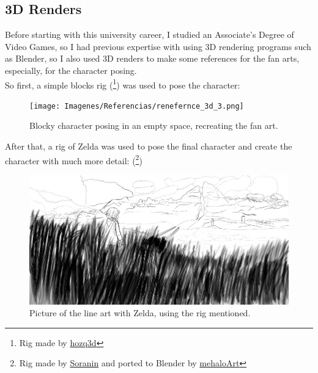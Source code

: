 \documentclass{cup-pan}
\begin{document}
    \subsection{3D Renders}
    Before starting with this university career, I studied an Associate's Degree of Video Games, so I had previous expertise with using 3D rendering programs such as Blender, so I also used 3D renders to make some references for the fan arts, especially, for the character posing. \\

    So first, a simple blocks rig
        (\footnote{Rig made by 
        \href{https://hozq3d.gumroad.com/l/Blocks}{hozq3d}}) 
    was used to pose the character: 
    \begin{figure}[H]
        \texttt{[image: Imagenes/Referencias/renefernce\_3d\_3.png]}
        \caption{Blocky character posing in an empty space, recreating the fan art.}
    \end{figure}

    After that, a rig of Zelda was used to pose the final character and create the character with much more detail:    
    (\footnote{Rig made by 
    \href{https://www.youtube.com/watch?v=1EUcGBMVRbA}{Soranin} and ported to Blender by  
    \href{https://twitter.com/mehaloArt/status/1528197222751383552?s=20}{mehaloArt}})

    \begin{figure}[H]
        \includegraphics[width=\textwidth]{Imagenes/Referencias/ref_zelda.png}
        \caption{Picture of the line art with Zelda, using the rig mentioned.}
    \end{figure}
\end{document}

